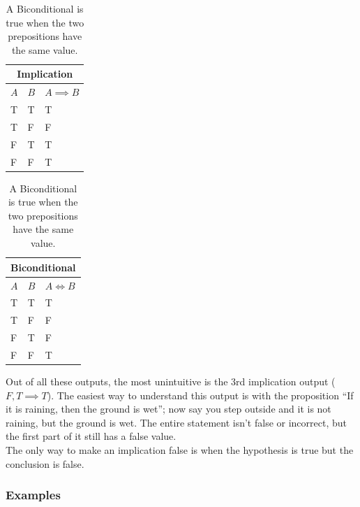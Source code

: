 \documentclass[12pt, letterpaper]{article}
\begin{document}
\begin{table}[h]
    \begin{subtable}[h]{0.45\textwidth}
        \centering
        \begin{tabular}{l | l | l}
		\multicolumn{3}{c}{\textbf{Implication}} \\
        \hline \hline
		$A$ & $B$ & $A \implies B$ \\
		\hline
		T & T & T \\
		T & F & F \\
		F & T & T \\
		F & F & T 
        \end{tabular}
		\caption*{\small{An implication is true when the hypothesis is false or the conclusion is true.}}
     \end{subtable}
    \hfill
    \begin{subtable}[h]{0.45\textwidth}
        \centering
        \begin{tabular}{l | l | l}
		\multicolumn{3}{c}{\textbf{Biconditional}} \\
        \hline \hline
		$A$ & $B$ & $A \iff B$ \\
		\hline
		T & T & T \\
		T & F & F \\
		F & T & F \\
		F & F & T 
        \end{tabular}
		\caption*{\small{A Biconditional is true when the two prepositions have the same value.}}
     \end{subtable}
\end{table}

Out of all these outputs, the most unintuitive is the 3rd implication output ($F, T \implies T$). The easiest way to understand this output is with the proposition ``If it is raining, then the ground is wet''; now say you step outside and it is not raining, but the ground is wet. The entire statement isn't false or incorrect, but the first part of it still has a false value. \\ The only way to make an implication false is when the hypothesis is true but the conclusion is false.


\pagebreak
\subsubsection{Examples}
\end{document}
